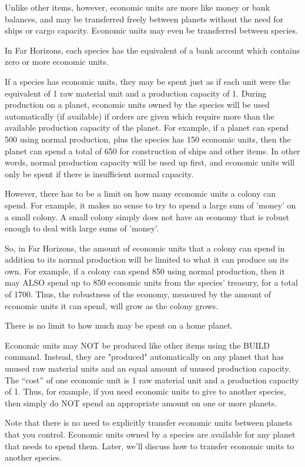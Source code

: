 \documentclass[10pt,titlepage]{article}
\begin{document}
Unlike other items, however, economic units are more like money or bank
balances, and may be transferred freely between planets without the need for
ships or cargo capacity.  Economic units may even be transferred between
species.

In Far Horizons, each species has the equivalent of a bank account which
contains zero or more economic units.

If a species has economic units, they may be spent just as if each unit were
the equivalent of 1 raw material unit and a production capacity of 1.  During
production on a planet, economic units owned by the species will be used
automatically (if available) if orders are given which require more than the
available production capacity of the planet.  For example, if a planet can
spend 500 using normal production, plus the species has 150 economic units,
then the planet can spend a total of 650 for construction of ships and other
items.  In other words, normal production capacity will be used up first, and
economic units will only be spent if there is insufficient normal capacity.

However, there has to be a limit on how many economic units a colony can spend.
For example, it makes no sense to try to spend a large sum of 'money' on a
small colony.  A small colony simply does not have an economy that is robust
enough to deal with large sums of 'money'.

So, in Far Horizons, the amount of economic units that a colony can spend in
addition to its normal production will be limited to what it can produce on its
own.  For example, if a colony can spend 850 using normal production, then it
may ALSO spend up to 850 economic units from the species' treasury, for a total
of 1700.  Thus, the robustness of the economy, measured by the amount of
economic units it can spend, will grow as the colony grows.

There is no limit to how much may be spent on a home planet.

Economic units may NOT be produced like other items using the BUILD command.
Instead, they are "produced" automatically on any planet that has unused raw
material units and an equal amount of unused production capacity.  The ``cost''
of one economic unit is 1 raw material unit and a production capacity of 1.
Thus, for example, if you need economic units to give to another species, then
simply do NOT spend an appropriate amount on one or more planets.

Note that there is no need to explicitly transfer economic units between
planets that you control.  Economic units owned by a species are available for
any planet that needs to spend them.  Later, we'll discuss how to transfer
economic units to another species.
\end{document}
